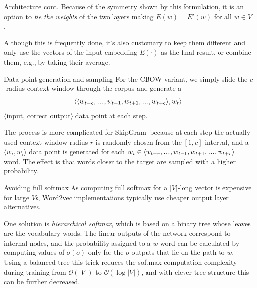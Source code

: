 \documentclass[style=upen, size=14pt]{powerdot}
\newcommand\varlist{,\makebox[1em][c]{.\hfil.\hfil.},}
\newcommand{\gold}{\color{arany}}
\theoremstyle{definition}
\begin{document}
\begin{slide}[toc=]{Architecture cont.}
  Because of the symmetry shown by this formulation, it is an option to
  \emph{tie the weights} of the two layers making $E(w) = E'(w)$ for all
  $w\in V$.

  Although this is frequently done, it's also customary to keep them different
  and only use the vectors of the input embedding $E(\cdot)$ as the final result, or
  combine them, e.g., by taking their average.
\end{slide}

\begin{slide}[toc=Data generation]{Data point generation and sampling}
  For the CBOW variant, we simply slide the $c$-radius context window through
  the corpus and generate a 
  $$\langle \langle w_{t-c}\varlist w_{t-1}, w_{t+1}\varlist w_{t+c} \rangle, w_t \rangle$$
  $\langle$input, correct output$\rangle$ data point at each step.\bigskip

  The process is more complicated for SkipGram, because at each step the
  actually used context window radius $r$ is randomly chosen from the $[1, c]$
  interval, and a $\langle w_t, w_i\rangle$ data point is generated for each
  $w_i\in \langle w_{t-r}\varlist w_{t-1}, w_{t+1}\varlist w_{t+r}\rangle$ word.
  The effect is that words closer to the target are sampled with a higher
  probability.
\end{slide}

\begin{slide}[toc=Softmax alternatives]{Avoiding full softmax}
  As computing full softmax for a $|V|$-long vector is expensive for large $V$s,
  Word2vec implementations typically use cheaper output layer
  alternatives.\bigskip

  One solution is \emph{\gold hierarchical softmax}, which is based on a binary
  tree whose leaves are the vocabulary words. The linear outputs of the network
  correspond to internal nodes, and the probability assigned to a $w$ word can
  be calculated by computing values of $\sigma(o)$ only for the $o$ outputs that
  lie on the path to $w$. Using a balanced tree this trick reduces the softmax
  computation complexity during training from $\mathcal O(|V|)$ to
  $\mathcal O({\log |V|})$, and with clever tree structure this can be further
  decreased.
\end{slide}
\end{document}
